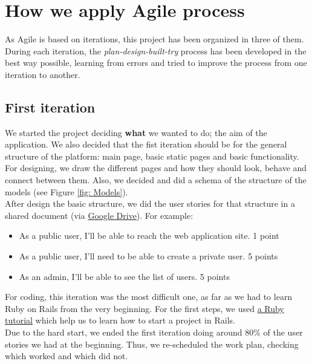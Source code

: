 
\section{How we apply Agile process}
As Agile is based on iterations, this project has been organized in three of them. During each iteration, the \textit{plan-design-built-try} process has been developed in the best way possible, learning from errors and tried to improve the process from one iteration to another.
	\subsection{First iteration}
	We started the project deciding \textbf{what} we wanted to do; the aim of the application. We also decided that the fist iteration should be for the general structure of the platform: main page, basic static pages and basic functionality. For designing, we draw the different pages and how they should look, behave and connect between them. Also, we decided and did a schema of the structure of the models (see Figure \ref{fig: Models}).\\
	After design the basic structure, we did the user stories for that structure in a shared document (via \href{https://drive.google.com/drive/my-drive/}{Google Drive}). For example:
	\begin{itemize} \setlength{\itemsep}{-5pt}
	\item As a public user, I’ll be able to reach the web application site. 1 point
	\item As a public user, I’ll need to be able to create a private user. 5 points
	\item As an admin, I’ll be able to see the list of users. 5 points
	\end{itemize}
	For coding, this iteration was the most difficult one, as far as we had to learn Ruby on Rails from the very beginning. For the first steps, we used \href{https://www.railstutorial.org/book/}{a Ruby tutorial} which help us to learn how to start a project in Rails.\\
	Due to the hard start, we ended the first iteration doing around 80\% of the user stories we had at the beginning. Thus, we re-scheduled the work plan, checking which worked and which did not.
